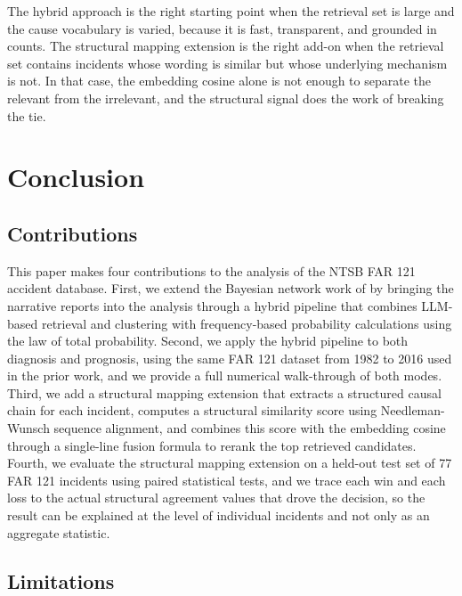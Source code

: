 \documentclass[11pt]{article}
\begin{document}
The hybrid approach is the right starting point when the retrieval set is large and the cause vocabulary is varied, because it is fast, transparent, and grounded in counts. The structural mapping extension is the right add-on when the retrieval set contains incidents whose wording is similar but whose underlying mechanism is not. In that case, the embedding cosine alone is not enough to separate the relevant from the irrelevant, and the structural signal does the work of breaking the tie.

\section{Conclusion}
\label{sec:conclusion}

\subsection{Contributions}
\label{sec:conclusion:contributions}

This paper makes four contributions to the analysis of the NTSB FAR 121 accident database. First, we extend the Bayesian network work of \citet{ZhangMahadevan2021} by bringing the narrative reports into the analysis through a hybrid pipeline that combines LLM-based retrieval and clustering with frequency-based probability calculations using the law of total probability. Second, we apply the hybrid pipeline to both diagnosis and prognosis, using the same FAR 121 dataset from 1982 to 2016 used in the prior work, and we provide a full numerical walk-through of both modes. Third, we add a structural mapping extension that extracts a structured causal chain for each incident, computes a structural similarity score using Needleman-Wunsch sequence alignment, and combines this score with the embedding cosine through a single-line fusion formula to rerank the top retrieved candidates. Fourth, we evaluate the structural mapping extension on a held-out test set of 77 FAR 121 incidents using paired statistical tests, and we trace each win and each loss to the actual structural agreement values that drove the decision, so the result can be explained at the level of individual incidents and not only as an aggregate statistic.

\subsection{Limitations}
\label{sec:conclusion:limitations}
\end{document}
